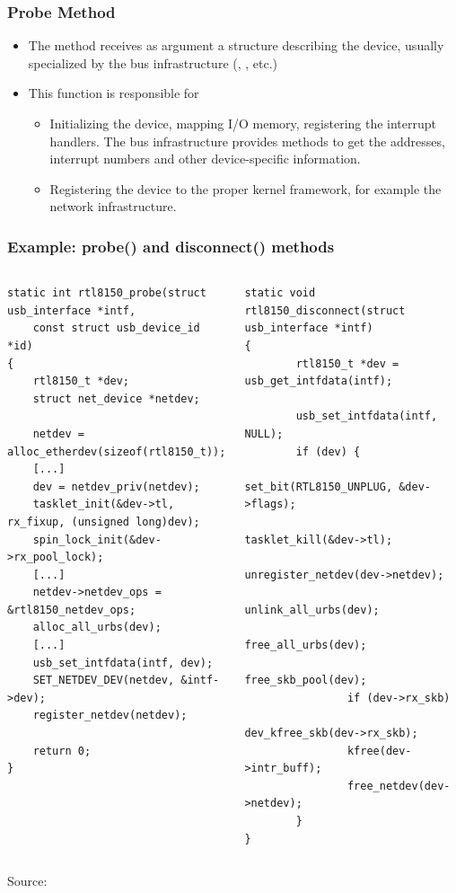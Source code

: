 \begin{frame}
  \frametitle{Probe Method}
  \begin{itemize}
  \item The  method receives as argument a structure
    describing the device, usually specialized by the bus
    infrastructure (, , etc.)
  \item This function is responsible for
    \begin{itemize}
    \item Initializing the device, mapping I/O memory, registering the
      interrupt handlers. The bus infrastructure provides methods to
      get the addresses, interrupt numbers and other device-specific
      information.
    \item Registering the device to the proper kernel framework, for
      example the network infrastructure.
    \end{itemize}
  \end{itemize}
\end{frame}

\begin{frame}[fragile]
\frametitle{Example: probe() and disconnect() methods}
\begin{columns}
    \begin{block}{}
    \begin{verbatim}
static int rtl8150_probe(struct usb_interface *intf,
    const struct usb_device_id *id)
{
    rtl8150_t *dev;
    struct net_device *netdev;

    netdev = alloc_etherdev(sizeof(rtl8150_t));
    [...]
    dev = netdev_priv(netdev);
    tasklet_init(&dev->tl, rx_fixup, (unsigned long)dev);
    spin_lock_init(&dev->rx_pool_lock);
    [...]
    netdev->netdev_ops = &rtl8150_netdev_ops;
    alloc_all_urbs(dev);
    [...]
    usb_set_intfdata(intf, dev);
    SET_NETDEV_DEV(netdev, &intf->dev);
    register_netdev(netdev);

    return 0;
}
    \end{verbatim}
    \end{block}
    \begin{block}{}
    \begin{verbatim}
static void rtl8150_disconnect(struct usb_interface *intf)
{
        rtl8150_t *dev = usb_get_intfdata(intf);

        usb_set_intfdata(intf, NULL);
        if (dev) {
                set_bit(RTL8150_UNPLUG, &dev->flags);
                tasklet_kill(&dev->tl);
                unregister_netdev(dev->netdev);
                unlink_all_urbs(dev);
                free_all_urbs(dev);
                free_skb_pool(dev);
                if (dev->rx_skb)
                        dev_kfree_skb(dev->rx_skb);
                kfree(dev->intr_buff);
                free_netdev(dev->netdev);
        }
}
    \end{verbatim}
    \end{block}
\end{columns}
\vfill
Source: 
\end{frame}

